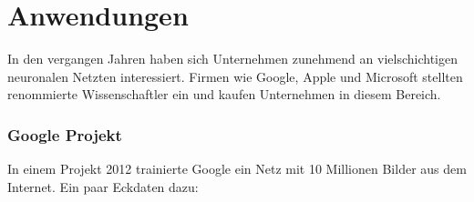 \chapter{Anwendungen}
\label{cha:anwendungen}

In den vergangen Jahren haben sich Unternehmen zunehmend an vielschichtigen neuronalen Netzten interessiert. Firmen wie Google, Apple und Microsoft stellten renommierte Wissenschaftler ein und kaufen Unternehmen in diesem Bereich.

\subsection{Google Projekt}

In einem Projekt 2012 trainierte Google ein Netz mit 10 Millionen Bilder aus dem Internet. Ein paar Eckdaten dazu:

